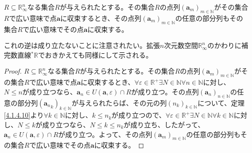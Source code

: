 \documentclass[dvipdfmx]{jsarticle}
\begin{document}
\begin{thm}\label{4.1.4.11}
$R \subseteq \mathbb{R}_{\infty}^{n}$なる集合$R$が与えられたとする。その集合$R$の点列$\left( \mathbf{a}_{m} \right)_{m \in \mathbb{N}}$がその集合$R$で広い意味で点$\mathbf{a}$に収束するとき、その点列$\left( \mathbf{a}_{m} \right)_{m \in \mathbb{N}}$の任意の部分列もその集合$R$で広い意味でその点$\mathbf{a}$に収束する。
\end{thm}\par
これの逆は成り立たないことに注意されたい。拡張$n$次元数空間$\mathbb{R}_{\infty}^{n}$のかわりに補完数直線${}^{*}\mathbb{R}$でおきかえても同様にして示される。
\begin{proof}
$R \subseteq \mathbb{R}_{\infty}^{n}$なる集合$R$が与えられたとする。その集合$R$の点列$\left( \mathbf{a}_{m} \right)_{m \in \mathbb{N}}$がその集合$R$で広い意味で点$\mathbf{a}$に収束するとき、$\forall\varepsilon \in \mathbb{R}^{+}\exists N \in \mathbb{N}\forall n \in \mathbb{N}$に対し、$N \leq n$が成り立つなら、$\mathbf{a}_{n} \in U\left( \mathbf{a},\varepsilon \right) \cap R$が成り立つ。その点列$\left( \mathbf{a}_{n} \right)_{n \in \mathbb{N}}$の任意の部分列$\left( {\mathbf{a}_{n}}_{k} \right)_{k \in \mathbb{N}}$が与えられたらば、その元の列$\left( n_{k} \right)_{k \in \mathbb{N}}$について、定理\ref{4.1.4.10}より$\forall k \in \mathbb{N}$に対し、$k \leq n_{k}$が成り立つので、$\forall\varepsilon \in \mathbb{R}^{+}\exists N \in \mathbb{N}\forall k \in \mathbb{N}$に対し、$N \leq k$が成り立つなら、$N \leq k \leq n_{k}$が成り立ち、したがって、$\mathbf{a}_{n} \in U\left( \mathbf{a},\varepsilon \right) \cap R$が成り立つ。よって、その点列$\left( \mathbf{a}_{m} \right)_{m \in \mathbb{N}}$の任意の部分列もその集合$R$で広い意味でその点$\mathbf{a}$に収束する。
\end{proof}
\end{document}
